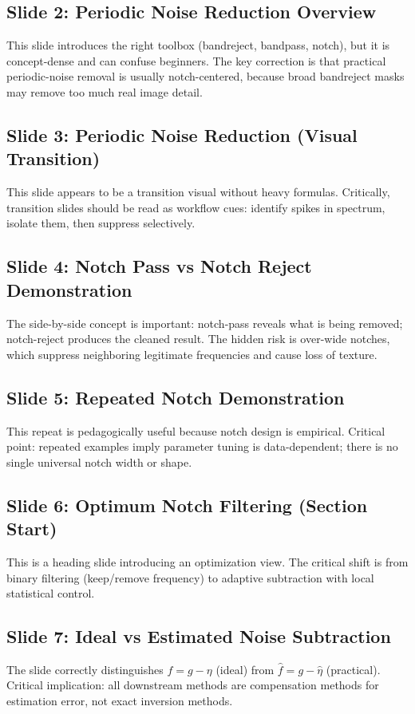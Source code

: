 \documentclass[12pt,a4paper]{article}
\begin{document}
\subsection{Slide 2: Periodic Noise Reduction Overview}
This slide introduces the right toolbox (bandreject, bandpass, notch), but it is concept-dense and can confuse beginners. The key correction is that practical periodic-noise removal is usually notch-centered, because broad bandreject masks may remove too much real image detail.

\subsection{Slide 3: Periodic Noise Reduction (Visual Transition)}
This slide appears to be a transition visual without heavy formulas. Critically, transition slides should be read as workflow cues: identify spikes in spectrum, isolate them, then suppress selectively.

\subsection{Slide 4: Notch Pass vs Notch Reject Demonstration}
The side-by-side concept is important: notch-pass reveals what is being removed; notch-reject produces the cleaned result. The hidden risk is over-wide notches, which suppress neighboring legitimate frequencies and cause loss of texture.

\subsection{Slide 5: Repeated Notch Demonstration}
This repeat is pedagogically useful because notch design is empirical. Critical point: repeated examples imply parameter tuning is data-dependent; there is no single universal notch width or shape.

\subsection{Slide 6: Optimum Notch Filtering (Section Start)}
This is a heading slide introducing an optimization view. The critical shift is from binary filtering (keep/remove frequency) to adaptive subtraction with local statistical control.

\subsection{Slide 7: Ideal vs Estimated Noise Subtraction}
The slide correctly distinguishes $f=g-\eta$ (ideal) from $\hat{f}=g-\hat{\eta}$ (practical). Critical implication: all downstream methods are compensation methods for estimation error, not exact inversion methods.
\end{document}
